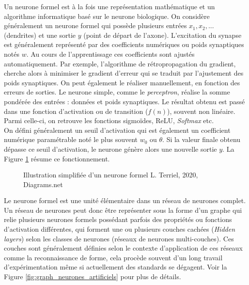 Un neurone formel est à la fois une représentation mathématique et un algorithme informatique basé sur le neurone biologique. On considère généralement un neurone formel qui possède plusieurs entrées $x_1, x_2, ...$ (dendrites) et une sortie $y$ (point de départ de l'axone). L'excitation du synapse est généralement représenté par des coefficients numériques ou poids synaptiques notés $w$. Au cours de l'apprentissage ces coefficients sont ajustés automatiquement. Par exemple, l'algorithme de rétropropagation du gradient, cherche alors à minimiser le gradient d'erreur qui se traduit par l'ajustement des poids synaptiques. On peut également le réaliser manuellement, en fonction des erreurs de sorties. Le neurone simple, comme le \textit{perceptron}, réalise la somme pondérée des entrées : données et poids synaptiques. Le résultat obtenu est passé dans une fonction d'activation ou de transition ($f(n)$), souvent non linéaire. Parmi celle-ci, on retrouve les fonctions sigmoïdes, ReLU, \textit{Softmax} etc. \\ 

On défini généralement un seuil d'activation qui est également un coefficient numérique paramétrable noté le plus souvent $w_0$ ou $\theta$. Si la valeur finale obtenu dépasse ce seuil d'activation, le neurone génère alors une nouvelle sortie $y$. La Figure \ref{fig:neurone_formel} résume ce fonctionnement.
\newpage
\begin{figure}[h]
    \centering
    \centerline{}
    \caption{Illustration simplifiée d'un neurone formel  \textcopyright L. Terriel, 2020, Diagrams.net}
    \label{fig:neurone_formel}
\end{figure}

Le neurone formel est une unité élémentaire dans un réseau de neurones complet. Un réseau de neurones peut donc être représenter sous la forme d'un graphe qui relie plusieurs neurones formels possédant parfois des propriétés ou fonctions d'activation différentes, qui forment une ou plusieurs couches cachées (\textit{Hidden layers}) selon les classes de neurones (réseaux de neurones multi-couches). Ces couches sont généralement définies selon le contexte d'application de ces réseaux comme la reconnaissance de forme, cela procède souvent d'un long travail d'expérimentation même si actuellement des standards se dégagent. Voir la Figure \ref{fig:graph_neurones_artificiels} pour plus de détails.\\

